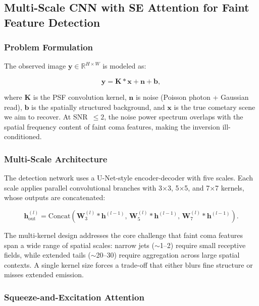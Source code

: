 \documentclass[preprint2]{aastex631}
\begin{document}
\subsection{Multi-Scale CNN with SE Attention for Faint Feature Detection}

\subsubsection{Problem Formulation}

The observed image $\mathbf{y} \in \mathbb{R}^{H \times W}$ is modeled as:

\begin{equation}\label{eq:forward_model}
\mathbf{y} = \mathbf{K} * \mathbf{x} + \mathbf{n} + \mathbf{b},
\end{equation}

where $\mathbf{K}$ is the PSF convolution kernel, $\mathbf{n}$ is noise (Poisson photon + Gaussian read), $\mathbf{b}$ is the spatially structured background, and $\mathbf{x}$ is the true cometary scene we aim to recover. At SNR~$\leq 2$, the noise power spectrum overlaps with the spatial frequency content of faint coma features, making the inversion ill-conditioned.

\subsubsection{Multi-Scale Architecture}

The detection network uses a U-Net-style encoder-decoder \citep{ronneberger15} with five scales. Each scale applies parallel convolutional branches with 3$\times$3, 5$\times$5, and 7$\times$7 kernels, whose outputs are concatenated:

\begin{equation}\label{eq:multi_kernel}
\mathbf{h}_{\text{out}}^{(l)} = \text{Concat}\left(\mathbf{W}_3^{(l)} * \mathbf{h}^{(l-1)},\, \mathbf{W}_5^{(l)} * \mathbf{h}^{(l-1)},\, \mathbf{W}_7^{(l)} * \mathbf{h}^{(l-1)}\right).
\end{equation}

The multi-kernel design addresses the core challenge that faint coma features span a wide range of spatial scales: narrow jets ($\sim$1--2\arcsec) require small receptive fields, while extended tails ($\sim$20--30\arcsec) require aggregation across large spatial contexts. A single kernel size forces a trade-off that either blurs fine structure or misses extended emission.

\subsubsection{Squeeze-and-Excitation Attention}
\end{document}
